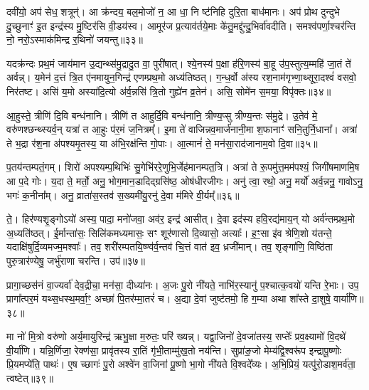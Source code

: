 दवी॑यो॒ अप॑ सेध॒ शत्रून्॑। आ क्र॑न्दय॒ बल॒मोजो॑ न॒ आ धा॒ नि ष्ट॑निहि दुरि॒ता बाध॑मानः। अप॑ प्रोथ दुन्दुभे दु॒च्छुनाꣳ॑ इ॒त इन्द्र॑स्य मु॒ष्टिर॑सि वी॒डय॑स्व। आमूर॑ज प्र॒त्याव॑र्तये॒माः के॑तु॒मद्दु॑न्दु॒भिर्वा॑वदीति। समश्व॑पर्णा॒श्चर॑न्ति नो॒ नरो॒\-ऽस्माक॑मिन्द्र र॒थिनो॑ जयन्तु॥३३॥

{\anuvakamend[{धन्व॑न्महि॒मानं॒ ब्राह्म॑णा॒सो\-ऽदि॑तिः पृथि॒व्याः परि॑ दू॒रादेक॑चत्वारिꣳशच्च॥६॥}]}

यदक्र॑न्दः प्रथ॒मं जाय॑मान उ॒द्यन्थ्स॑मु॒द्रादु॒त वा॒ पुरी॑षात्। श्ये॒नस्य॑ प॒क्षा ह॑रि॒णस्य॑ बा॒हू उ॑प॒स्तुत्य॒म्महि॑ जा॒तं ते॑ अर्वन्न्। य॒मेन॑ द॒त्तं त्रि॒त ए॑नमायुन॒गिन्द्र॑ एणम्प्रथ॒मो अध्य॑तिष्ठत्। ग॒न्ध॒र्वो अ॑स्य रश॒नाम॑गृभ्णा॒थ्सूरा॒दश्वं॑ वसवो॒ निर॑तष्ट। असि॑ य॒मो अस्या॑दि॒त्यो अ॑र्व॒न्नसि॑ त्रि॒तो गुह्ये॑न व्र॒तेन॑। असि॒ सोमे॑न स॒मया॒ विपृ॑क्तः॥३४॥

आ॒हुस्ते॒ त्रीणि॑ दि॒वि बन्ध॑नानि। त्रीणि॑ त आहुर्दि॒वि बन्ध॑नानि॒ त्रीण्य॒प्सु त्रीण्य॒न्तः स॑मु॒द्रे। उ॒तेव॑ मे॒ वरु॑णश्छन्थ्स्यर्व॒न् यत्रा॑ त आ॒हुः प॑र॒मं ज॒नित्रम्᳚। इ॒मा ते॑ वाजिन्नव॒मार्ज॑नानी॒मा श॒फानाꣳ॑ सनि॒तुर्नि॒धाना᳚। अत्रा॑ ते भ॒द्रा र॑श॒ना अ॑पश्यमृ॒तस्य॒ या अ॑भि॒रक्ष॑न्ति गो॒पाः। आ॒त्मानं॑ ते॒ मन॑सा॒राद॑जानाम॒वो दि॒वा॥३५॥

प॒तय॑न्तम्पतं॒गम्। शिरो॑ अपश्यम्प॒थिभिः॑ सु॒गेभि॑ररे॒णुभि॒र्जेह॑मानम्पत॒त्रि। अत्रा॑ ते रू॒पमु॑त्त॒मम॑पश्यं॒ जिगी॑षमाणमि॒ष आ प॒दे गोः। य॒दा ते॒ मर्तो॒ अनु॒ भोग॒मान॒डादिद्ग्रसि॑ष्ठ॒ ओष॑धीरजीगः। अनु॑ त्वा॒ रथो॒ अनु॒ मर्यो॑ अर्व॒न्ननु॒ गावो\-ऽनु॒ भगः॑ क॒नीना᳚म्। अनु॒ व्राता॑स॒स्तव॑ स॒ख्यमी॑यु॒रनु॑ दे॒वा म॑मिरे वी॒र्यम्᳚॥३६॥

ते॒। हिर॑ण्यशृ॒ङ्गो\-ऽयो॑ अस्य॒ पादा॒ मनो॑जवा॒ अव॑र॒ इन्द्र॑ आसीत्। दे॒वा इद॑स्य हवि॒रद्य॑माय॒न् यो अर्व॑न्तम्प्रथ॒मो अ॒ध्यति॑ष्ठत्। ई॒र्मान्ता॑सः॒ सिलि॑कमध्यमासः॒ सꣳ शूर॑णासो दि॒व्यासो॒ अत्याः᳚। ह॒ꣳ॒सा इ॑व श्रेणि॒शो य॑तन्ते॒ यदाक्षि॑षुर्दि॒व्यमज्म॒मश्वाः᳚। तव॒ शरी॑रम्पतयि॒ष्ण्व॑र्व॒न्तव॑ चि॒त्तं वात॑ इव॒ ध्रजी॑मान्। तव॒ शृङ्गा॑णि॒ विष्ठि॑ता पुरु॒त्रार॑ण्येषु॒ जर्भु॑राणा चरन्ति। उप॑॥३७॥

प्रागा॒च्छस॑नं वा॒ज्यर्वा॑ देव॒द्रीचा॒ मन॑सा॒ दीध्या॑नः। अ॒जः पु॒रो नी॑यते॒ नाभि॑र॒स्यानु॑ प॒श्चात्क॒वयो॑ यन्ति रे॒भाः। उप॒ प्रागा᳚त्पर॒मं यथ्स॒धस्थ॒मर्वा॒ꣳ॒ अच्छा॑ पि॒तर॑म्मा॒तरं॑ च। अ॒द्या दे॒वां जुष्ट॑तमो॒ हि ग॒म्या अथा शा᳚स्ते दा॒शुषे॒ वार्या॑णि॥३८॥

{\anuvakamend[{विपृ॑क्तो दि॒वा वी॒र्य॑मुपैका॒न्नच॑त्वारि॒ꣳ॒शच्च॑॥७॥}]}

मा नो॑ मि॒त्रो वरु॑णो अर्य॒मायुरिन्द्र॑ ऋभु॒क्षा म॒रुतः॒ परि॑ ख्यन्न्। यद्वा॒जिनो॑ दे॒वजा॑तस्य॒ सप्तेः᳚ प्रव॒क्ष्यामो॑ वि॒दथे॑ वी॒र्या॑णि। यन्नि॒र्णिजा॒ रेक्ण॑सा॒ प्रावृ॑तस्य रा॒तिं गृ॑भी॒ताम्मु॑ख॒तो नय॑न्ति। सुप्रा॑ङ॒जो मेम्य॑द्वि॒श्वरू॑प इन्द्रापू॒ष्णोः प्रि॒यमप्ये॑ति॒ पाथः॑। ए॒ष च्छागः॑ पु॒रो अश्वे॑न वा॒जिना॑ पू॒ष्णो भा॒गो नी॑यते वि॒श्वदे᳚व्यः। अ॒भि॒प्रियं॒ यत्पु॑रो॒डाश॒मर्व॑ता॒ त्वष्टेत्॥३९॥


